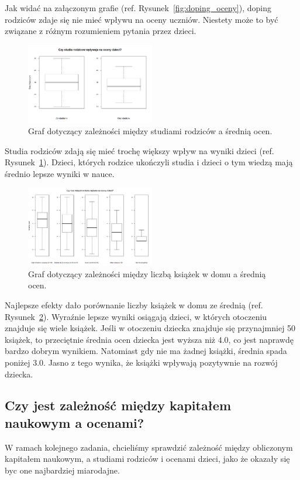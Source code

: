 \documentclass[conference]{IEEEtran}
\begin{document}
Jak widać na załączonym grafie (ref. Rysunek~\ref{fig:doping_oceny}), doping rodziców zdaje się nie mieć wpływu na oceny uczniów. Niestety może to być związane z różnym rozumieniem pytania przez dzieci.

\begin{figure}
	\centering
	\includegraphics[width=0.5\textwidth]{4.png}
	\caption{Graf dotyczący zależności między studiami rodziców a średnią ocen.}
	\label{fig:studia_oceny}
\end{figure}

Studia rodziców zdają się mieć trochę większy wpływ na wyniki dzieci (ref. Rysunek~\ref{fig:studia_oceny}). Dzieci, których rodzice ukończyli studia i dzieci o tym wiedzą mają średnio lepsze wyniki w nauce.

\begin{figure}
	\centering
	\includegraphics[width=0.5\textwidth]{5.png}
	\caption{Graf dotyczący zależności między liczbą książek w domu a średnią ocen.}
	\label{fig:ksiazki_oceny}
\end{figure}

Najlepsze efekty dało porównanie liczby książek w domu ze średnią (ref. Rysunek~\ref{fig:ksiazki_oceny}). Wyraźnie lepsze wyniki osiągają dzieci, w których otoczeniu znajduje się wiele książek. Jeśli w otoczeniu dziecka znajduje się przynajmniej 50 książek, to przeciętnie średnia ocen dziecka jest wyższa niż 4.0, co jest naprawdę bardzo dobrym wynikiem. Natomiast gdy nie ma żadnej książki, średnia spada poniżej 3.0. Jasno z tego wynika, że książki wpływają pozytywnie na rozwój dziecka.

\subsection{Czy jest zależność między kapitałem naukowym a ocenami?}
W ramach kolejnego zadania, chcieliśmy sprawdzić zależność między obliczonym kapitałem naukowym, a studiami rodziców i ocenami dzieci, jako że okazały się byc one najbardziej miarodajne.
\end{document}
